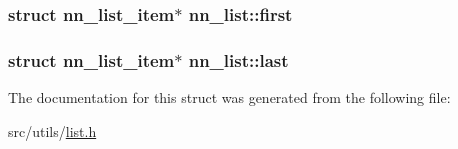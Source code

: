 \subsubsection[{first}]{\setlength{\rightskip}{0pt plus 5cm}struct {\bf nn\+\_\+list\+\_\+item}$\ast$ nn\+\_\+list\+::first}\hypertarget{structnn__list_a98de32a9535052c37fd08fa23c974e8e}{}\label{structnn__list_a98de32a9535052c37fd08fa23c974e8e}
\subsubsection[{last}]{\setlength{\rightskip}{0pt plus 5cm}struct {\bf nn\+\_\+list\+\_\+item}$\ast$ nn\+\_\+list\+::last}\hypertarget{structnn__list_aee15a11389419a66b183b0246a3e4683}{}\label{structnn__list_aee15a11389419a66b183b0246a3e4683}


The documentation for this struct was generated from the following file\+:\begin{DoxyCompactItemize}
\item 
src/utils/\hyperlink{list_8h}{list.\+h}\end{DoxyCompactItemize}
